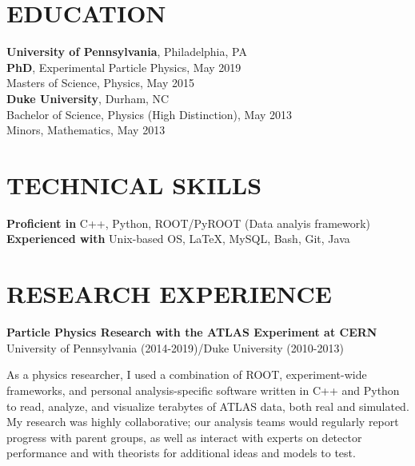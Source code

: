 \documentclass[10pt]{res}
\begin{document}
\begin{resume}

 
\section{EDUCATION}          
    {\bf University of Pennsylvania}, Philadelphia, PA \\
    {\bf PhD}, Experimental Particle Physics, May 2019 \\
    Masters of Science, Physics, May 2015 \\
    \newline
    {\bf Duke University}, Durham, NC \\        
    Bachelor of Science, Physics (High Distinction), May 2013   \\       
    Minors, Mathematics, May 2013 
 
\section{TECHNICAL SKILLS}
    {\bf Proficient in} C++, Python, ROOT/PyROOT (Data analyis framework)\\
    {\bf Experienced with} Unix-based OS, \LaTeX, MySQL, Bash, Git, Java %

\section{RESEARCH EXPERIENCE}%
    {\bf Particle Physics Research with the ATLAS Experiment at CERN}\\
    University of Pennsylvania (2014-2019)/Duke University (2010-2013)

    As a physics researcher, I used a combination of ROOT, experiment-wide frameworks, and personal analysis-specific software written in C++ and Python to read, analyze, and visualize terabytes of ATLAS data, both real and simulated.
    My research was highly collaborative; our analysis teams would regularly report progress with parent groups, as well as interact with experts on detector performance and with theorists for additional ideas and models to test.
    

\end{resume}
\end{document}
